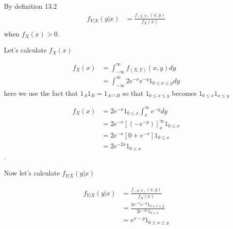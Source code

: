 
By definition 13.2
\begin{align*}
    f_{Y|X} (y|x) &= \frac{f_{(X,Y)} (x,y)}{f_{X} (x)} \\
\end{align*}
when $ f_{X} (x) > 0$.

Let's calculate $ f_{X} (x) $

\begin{align*}
    f_{X} (x) &= \int_{-\infty}^{\infty} f_{(X,Y)} (x,y) dy\\
	      &= \int_{-\infty}^{\infty} 2 e^{-x} e^{-y} 1_{0 \leq x \leq y} dy 
\end{align*}
here we use the fact that $ 1_{A} 1_{B}  = 1_{A \cap B} $ so that $ 1_{0 \leq x \leq y} $ becomes $
1_{0 \leq x} 1_{x \leq y} $

\begin{align*}
    f_{X} (x) &= 2 e^{-x} 1_{0 \leq x}  \int_{x}^{\infty} e^{-y} dy\\
	      &= 2 e^{-x} [(-e^{-y} )]_{x}^{\infty} 1_{0 \leq x} \\
	      &= 2e^{-x} [0+ e^{-x} ] 1_{0 \leq x} \\
	      &= 2 e^{-2x} 1_{0 \leq x}  
\end{align*}.

Now let's calculate $ f_{Y|X} (y|x)$

\begin{align*}
     f_{Y|X} (y|x) &= \frac{f_{(X,Y)} (x,y)}{f_{X} (x)} \\
		   &= \frac{2 e^{-x} e^{-y} 1_{0 \leq x \leq y}  }{2 e^{-2x} 1_{0 \leq x}  }\\
		   &= e^{x-y} 1_{0 \leq x \leq y} 
\end{align*}
